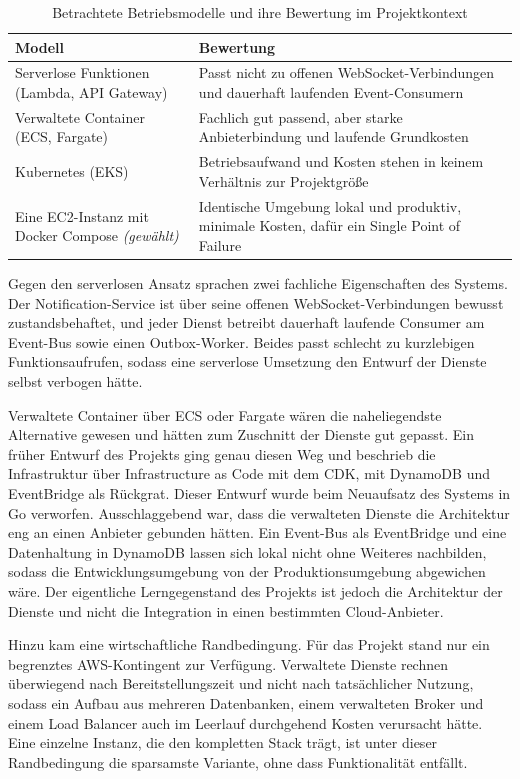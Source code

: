 \begin{table}[ht]
  \centering
  \caption{Betrachtete Betriebsmodelle und ihre Bewertung im Projektkontext}
  \label{tab:betriebsmodelle}
  \begin{tabularx}{\linewidth}{@{}>{\raggedright\arraybackslash}p{4.6cm}X@{}}
    \toprule
    \textbf{Modell} & \textbf{Bewertung} \\
    \midrule
    Serverlose Funktionen (Lambda, API Gateway) & Passt nicht zu offenen WebSocket-Verbindungen und dauerhaft laufenden Event-Consumern \\
    Verwaltete Container (ECS, Fargate) & Fachlich gut passend, aber starke Anbieterbindung und laufende Grundkosten \\
    Kubernetes (EKS) & Betriebsaufwand und Kosten stehen in keinem Verhältnis zur Projektgröße \\
    Eine EC2-Instanz mit Docker Compose \emph{(gewählt)} & Identische Umgebung lokal und produktiv, minimale Kosten, dafür ein Single Point of Failure \\
    \bottomrule
  \end{tabularx}
\end{table}

Gegen den serverlosen Ansatz sprachen zwei fachliche Eigenschaften des Systems. Der Notification-Service ist über seine offenen WebSocket-Verbindungen bewusst zustandsbehaftet, und jeder Dienst betreibt dauerhaft laufende Consumer am Event-Bus sowie einen Outbox-Worker. Beides passt schlecht zu kurzlebigen Funktionsaufrufen, sodass eine serverlose Umsetzung den Entwurf der Dienste selbst verbogen hätte.

Verwaltete Container über ECS oder Fargate wären die naheliegendste Alternative gewesen und hätten zum Zuschnitt der Dienste gut gepasst. Ein früher Entwurf des Projekts ging genau diesen Weg und beschrieb die Infrastruktur über Infrastructure as Code mit dem CDK, mit DynamoDB und EventBridge als Rückgrat. Dieser Entwurf wurde beim Neuaufsatz des Systems in Go verworfen. Ausschlaggebend war, dass die verwalteten Dienste die Architektur eng an einen Anbieter gebunden hätten. Ein Event-Bus als EventBridge und eine Datenhaltung in DynamoDB lassen sich lokal nicht ohne Weiteres nachbilden, sodass die Entwicklungsumgebung von der Produktionsumgebung abgewichen wäre. Der eigentliche Lerngegenstand des Projekts ist jedoch die Architektur der Dienste und nicht die Integration in einen bestimmten Cloud-Anbieter.

Hinzu kam eine wirtschaftliche Randbedingung. Für das Projekt stand nur ein begrenztes AWS-Kontingent zur Verfügung. Verwaltete Dienste rechnen überwiegend nach Bereitstellungszeit und nicht nach tatsächlicher Nutzung, sodass ein Aufbau aus mehreren Datenbanken, einem verwalteten Broker und einem Load Balancer auch im Leerlauf durchgehend Kosten verursacht hätte. Eine einzelne Instanz, die den kompletten Stack trägt, ist unter dieser Randbedingung die sparsamste Variante, ohne dass Funktionalität entfällt.

